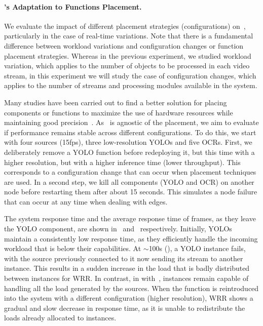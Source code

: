 \paragraph{\videojam{}'s Adaptation to Functions Placement.}
We evaluate the impact of different placement strategies (configurations) on~\videojam{}, particularly in the case of real-time variations. Note that there is a fundamental difference between workload variations and configuration changes or function placement strategies. Whereas in the previous experiment, we studied workload variation, which applies to the number of objects to be processed in each video stream, in this experiment we will study the case of configuration changes, which applies to the number of streams and processing modules available in the system.

Many studies have been carried out to find a better solution for placing components or functions to maximize the use of hardware resources while maintaining good precision~\cite{201465videostorm,hung2018videoedge}. As~\videojam{} is agnostic of the placement, we aim to evaluate if performance remains stable across different configurations. To do this, we start with four sources (15fps), three low-resolution YOLOs and five OCRs. First, we deliberately remove a YOLO function before redeploying it, but this time with a higher resolution, but with a higher inference time (lower throughput). This corresponds to a configuration change that can occur when placement techniques are used. In a second step, we kill all components (YOLO and OCR) on another node before restarting them after about 15 seconds. This simulates a node failure that can occur at any time when dealing with edges.

The system response time and the average response time of frames, as they leave the YOLO component, are shown in~ and~ respectively. Initially, YOLOs maintain a consistently low response time, as they efficiently handle the incoming workload that is below their capabilities. At $\sim$100s (), a YOLO instance fails, with the source previously connected to it now sending its stream to another instance. This results in a sudden increase in the load that is badly distributed between instances for WRR. In contrast, in with~\videojam{}, instances remain capable of handling all the load generated by the sources. When the function is reintroduced into the system with a different configuration (higher resolution), WRR shows a gradual and slow decrease in response time, as it is unable to redistribute the loads already allocated to instances. 

